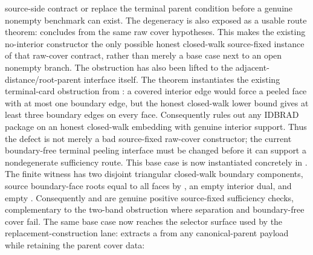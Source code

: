 \documentclass[11pt]{article}
\begin{document}
\begin{itemize}
source-side contract or replace the terminal parent condition before a genuine
nonempty benchmark can exist.
The degeneracy is also exposed as a usable route theorem:
concludes  from the same raw cover
hypotheses.  This makes the existing no-interior constructor the only possible
honest closed-walk source-fixed instance of that raw-cover contract, rather
than merely a base case next to an open nonempty branch.
The obstruction has also been lifted to the adjacent-distance/root-parent
interface itself.  The theorem
instantiates the existing terminal-card obstruction from
: a covered
interior edge would force a peeled face with at most one boundary edge, but
the honest closed-walk lower bound gives at least three boundary edges on
every face.  Consequently
rules out any IDBRAD package on an honest closed-walk embedding with genuine
interior support.  Thus the defect is not merely a bad source-fixed raw-cover
constructor; the current boundary-free terminal peeling interface must be
changed before it can support a nondegenerate sufficiency route.
This base case is now instantiated concretely in
.
The finite witness  has two disjoint triangular
closed-walk boundary components, source boundary-face roots equal to all faces
by , an empty interior dual,
and empty .  Consequently
 and
are genuine positive source-fixed sufficiency checks, complementary to the
two-band obstruction where separation and boundary-free cover fail.  The same
base case now reaches the selector surface used by the replacement-construction
lane:
extracts a  from any canonical-parent
payload while retaining the parent cover data:

\end{itemize}
\end{document}
